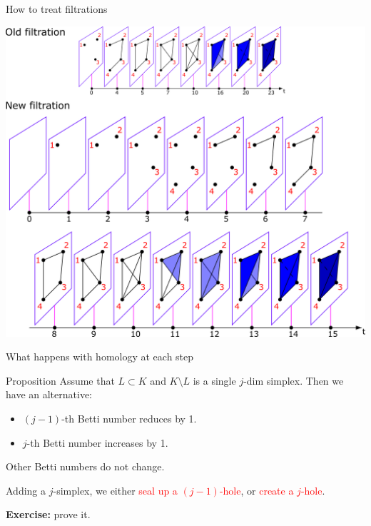 \documentclass[10pt,xcolor={usenames}]{beamer}
\begin{document}
\begin{frame}{How to treat filtrations}

\begin{center}
\includegraphics[scale=0.14]{pictures/filtration4.pdf}
\end{center}

\end{frame}

\begin{frame}{What happens with homology at each step}

\begin{block}{Proposition}
Assume that $L\subset K$ and $K\setminus L$ is a single $j$-dim simplex. Then we have an alternative:
\begin{itemize}
  \item $(j-1)$-th Betti number reduces by 1.
  \item $j$-th Betti number increases by 1.
\end{itemize}
Other Betti numbers do not change.
\end{block}

Adding a $j$-simplex, we either \textcolor{red}{seal up a $(j-1)$-hole}, or \textcolor{red}{create a $j$-hole}.

\textbf{Exercise:} prove it.
\end{frame}
\end{document}
